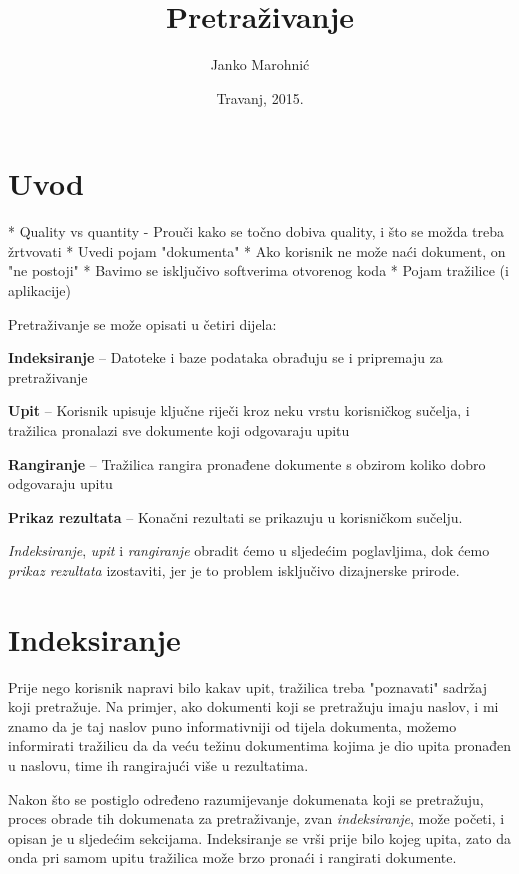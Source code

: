 \documentclass[a4paper,twoside,12pt]{memoir}
\title{Pretraživanje}
\author{Janko Marohnić}
\date{Travanj, 2015.}
\begin{document}
\frontmatter

\chapter{Uvod}

* Quality vs quantity
  - Prouči kako se točno dobiva quality, i što se možda treba žrtvovati
* Uvedi pojam "dokumenta"
* Ako korisnik ne može naći dokument, on "ne postoji"
* Bavimo se isključivo softverima otvorenog koda
* Pojam tražilice (i aplikacije)

Pretraživanje se može opisati u četiri dijela:

\begin{compactenum}
  \item \textbf{Indeksiranje} – Datoteke i baze podataka obrađuju se i pripremaju za pretraživanje
  \item \textbf{Upit} – Korisnik upisuje ključne riječi kroz neku vrstu korisničkog sučelja, i tražilica pronalazi sve dokumente koji odgovaraju upitu
  \item \textbf{Rangiranje} – Tražilica rangira pronađene dokumente s obzirom koliko dobro odgovaraju upitu
  \item \textbf{Prikaz rezultata} – Konačni rezultati se prikazuju u korisničkom sučelju.
\end{compactenum}

\textit{Indeksiranje}, \textit{upit} i \textit{rangiranje} obradit ćemo u sljedećim poglavljima, dok ćemo \textit{prikaz rezultata} izostaviti, jer je to problem isključivo dizajnerske prirode.

\chapter{Indeksiranje} \label{indexing}

Prije nego korisnik napravi bilo kakav upit, tražilica treba "poznavati" sadržaj koji pretražuje. Na primjer, ako dokumenti koji se pretražuju imaju naslov, i mi znamo da je taj naslov puno informativniji od tijela dokumenta, možemo informirati tražilicu da da veću težinu dokumentima kojima je dio upita pronađen u naslovu, time ih rangirajući više u rezultatima.

Nakon što se postiglo određeno razumijevanje dokumenata koji se pretražuju, proces obrade tih dokumenata za pretraživanje, zvan \textit{indeksiranje}, može početi, i opisan je u sljedećim sekcijama. Indeksiranje se vrši prije bilo kojeg upita, zato da onda pri samom upitu tražilica može brzo pronaći i rangirati dokumente.
\end{document}

